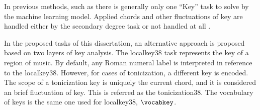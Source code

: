
In previous methods, such as \textcite{chen2018functional,
chen2019harmony, micchi2020not, micchi2021deep,
mcleod2021modular} there is generally only one ``Key'' task
to solve by the machine learning model. Applied chords and
other fluctuations of key are handled either by the
secondary degree task \parencite{chen2021, micchi2021deep}
or not handled at all \parencite{mcleod2021modular}.

In the proposed tasks of this dissertation, an alternative
approach is proposed based on two layers of key analysis.
The \gls{localkey38} task represents the key of a region of
music. By default, any Roman numeral label is interpreted in
reference to the \gls{localkey38}. However, for cases of
tonicization, a different key is encoded. The scope of a
tonicization key is uniquely the current chord, and it is
considered an brief fluctuation of key. This is referred as
the \gls{tonicization38}. The vocabulary of keys is the same
one used for \gls{localkey38}, $\vocabkey$.
